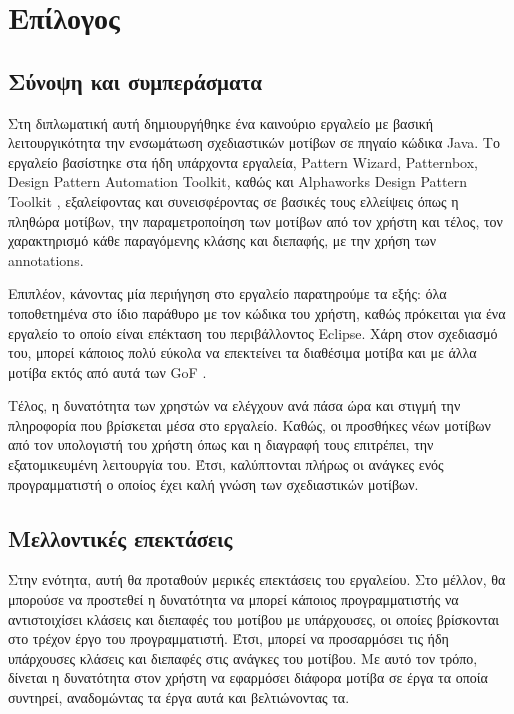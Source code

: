 \chapter{Επίλογος}
\label{ch:epilogue}
\section{Σύνοψη και συμπεράσματα}
\label{sec:conclusion}
Στη διπλωματική αυτή δημιουργήθηκε ένα καινούριο εργαλείο 
με βασική λειτουργικότητα την ενσωμάτωση σχεδιαστικών μοτίβων σε πηγαίο κώδικα Java. 
Το εργαλείο βασίστηκε στα ήδη υπάρχοντα εργαλεία, Pattern Wizard, Patternbox, Design Pattern Automation Toolkit, καθώς και 
Alphaworks Design Pattern Toolkit \cite{PatternBox}, εξαλείφοντας  και συνεισφέροντας  σε βασικές 
τους ελλείψεις όπως η πληθώρα μοτίβων, την παραμετροποίηση των μοτίβων από τον χρήστη και τέλος, τον χαρακτηρισμό 
κάθε παραγόμενης κλάσης και διεπαφής, με την χρήση των annotations.\par
Επιπλέον, κάνοντας μία περιήγηση στο εργαλείο παρατηρούμε τα εξής: όλα τοποθετημένα στο ίδιο παράθυρο με τον κώδικα του χρήστη, 
καθώς πρόκειται για ένα εργαλείο το οποίο είναι επέκταση του περιβάλλοντος Eclipse.
Χάρη στον σχεδιασμό του, μπορεί κάποιος πολύ εύκολα να επεκτείνει τα διαθέσιμα μοτίβα 
και με άλλα μοτίβα εκτός από αυτά των GoF \cite{GoF}.\par Τέλος, η δυνατότητα των χρηστών να ελέγχουν ανά πάσα ώρα και στιγμή την πληροφορία 
που βρίσκεται μέσα στο εργαλείο. Καθώς, οι προσθήκες νέων μοτίβων από τον υπολογιστή του χρήστη όπως και η διαγραφή τους επιτρέπει, 
την εξατομικευμένη λειτουργία του. Έτσι, καλύπτονται πλήρως οι ανάγκες ενός προγραμματιστή ο οποίος έχει καλή γνώση των σχεδιαστικών μοτίβων.
\section{Μελλοντικές επεκτάσεις}
\label{sec:features}
Στην ενότητα, αυτή θα προταθούν μερικές επεκτάσεις του εργαλείου. Στο μέλλον, θα μπορούσε να προστεθεί η δυνατότητα 
να μπορεί κάποιος προγραμματιστής να αντιστοιχίσει κλάσεις και διεπαφές του μοτίβου με υπάρχουσες, 
οι οποίες βρίσκονται στο τρέχον έργο του προγραμματιστή. Έτσι, μπορεί να προσαρμόσει 
τις ήδη υπάρχουσες κλάσεις και διεπαφές στις ανάγκες του μοτίβου. Με αυτό τον τρόπο, δίνεται η δυνατότητα στον χρήστη
να εφαρμόσει διάφορα μοτίβα σε έργα τα οποία συντηρεί, αναδομώντας τα έργα αυτά και βελτιώνοντας τα.
